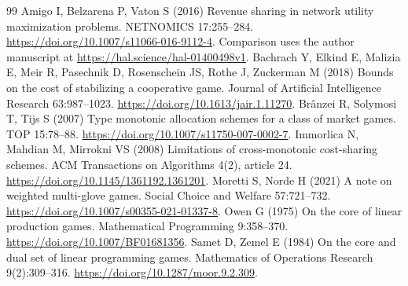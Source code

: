 \documentclass[11pt]{article}
\theoremstyle{definition}\newtheorem{definition}[theorem]{Definition}
\theoremstyle{remark}\newtheorem{remark}[theorem]{Remark}
\begin{document}
\begin{thebibliography}{99}
Amigo I, Belzarena P, Vaton S (2016) Revenue sharing in network utility
maximization problems. NETNOMICS 17:255--284.
\url{https://doi.org/10.1007/s11066-016-9112-4}.
Comparison uses the author manuscript at \url{https://hal.science/hal-01400498v1}.
Bachrach Y, Elkind E, Malizia E, Meir R, Pasechnik D, Rosenschein JS,
Rothe J, Zuckerman M (2018) Bounds on the cost of stabilizing a cooperative
game. Journal of Artificial Intelligence Research 63:987--1023.
\url{https://doi.org/10.1613/jair.1.11270}.
Br\^anzei R, Solymosi T, Tijs S (2007) Type monotonic allocation schemes
for a class of market games. TOP 15:78--88.
\url{https://doi.org/10.1007/s11750-007-0002-7}.
Immorlica N, Mahdian M, Mirrokni VS (2008) Limitations of cross-monotonic
cost-sharing schemes. ACM Transactions on Algorithms 4(2), article 24.
\url{https://doi.org/10.1145/1361192.1361201}.
Moretti S, Norde H (2021) A note on weighted multi-glove games.
Social Choice and Welfare 57:721--732. \url{https://doi.org/10.1007/s00355-021-01337-8}.
Owen G (1975) On the core of linear production games.
Mathematical Programming 9:358--370.
\url{https://doi.org/10.1007/BF01681356}.
Samet D, Zemel E (1984) On the core and dual set of linear programming games.
Mathematics of Operations Research 9(2):309--316.
\url{https://doi.org/10.1287/moor.9.2.309}.
\end{thebibliography}
\end{document}
